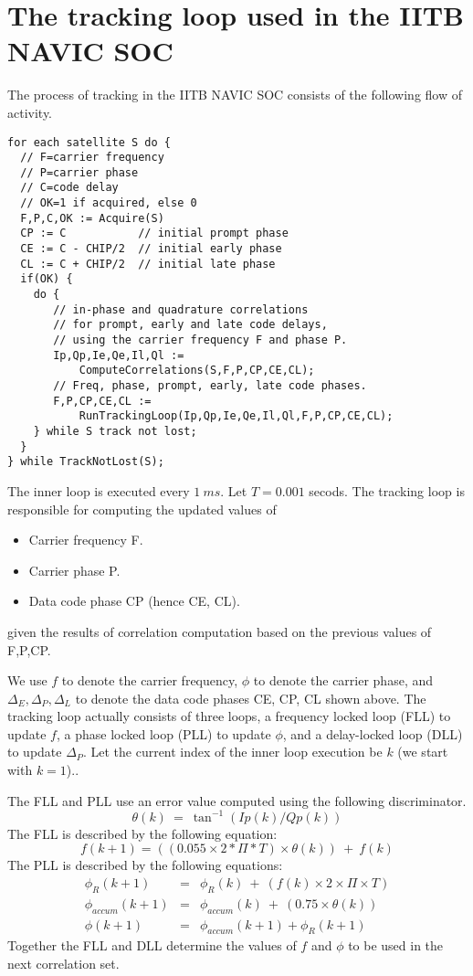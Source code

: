 \section{The tracking loop used in the IITB NAVIC SOC}

The process of tracking in the IITB NAVIC SOC consists of
the following flow of activity.

\begin{verbatim}
for each satellite S do {
  // F=carrier frequency
  // P=carrier phase
  // C=code delay
  // OK=1 if acquired, else 0
  F,P,C,OK := Acquire(S)
  CP := C           // initial prompt phase
  CE := C - CHIP/2  // initial early phase
  CL := C + CHIP/2  // initial late phase
  if(OK) {
    do {
       // in-phase and quadrature correlations
       // for prompt, early and late code delays,
       // using the carrier frequency F and phase P.
       Ip,Qp,Ie,Qe,Il,Ql := 
           ComputeCorrelations(S,F,P,CP,CE,CL);
       // Freq, phase, prompt, early, late code phases.
       F,P,CP,CE,CL :=
           RunTrackingLoop(Ip,Qp,Ie,Qe,Il,Ql,F,P,CP,CE,CL);
    } while S track not lost;
  }
} while TrackNotLost(S);
\end{verbatim}

The inner loop is executed every $1\ ms$. Let $T=0.001$ secods.
The tracking loop is responsible for computing
the updated values of 
\begin{itemize}
\item Carrier frequency F.
\item Carrier phase P.
\item Data code phase CP (hence CE, CL).
\end{itemize}
given the results of correlation computation based
on the previous values of F,P,CP.

We use $f$ to denote the carrier frequency,
$\phi$ to denote the carrier phase, and $\Delta_E, \Delta_P, \Delta_L$
to denote the data code phases CE, CP, CL shown above.  The tracking
loop actually consists of three loops, a frequency locked loop (FLL) to
update $f$, a phase locked loop (PLL) to update $\phi$, and a delay-locked
loop (DLL) to update $\Delta_P$.  Let the current index of the inner
loop execution be $k$ (we start with $k=1$)..

The FLL and PLL use an error value computed using the following
discriminator.
\begin{equation}
\theta(k) \ = \ \tan^{-1}(Ip(k)/Qp(k))
\end{equation}
The FLL is described by the following equation:
\begin{equation}
f(k+1)  =  ((0.055 \times 2 * \Pi * T) \times \theta(k))\ + \ f(k)
\end{equation}
The PLL is described by the following equations:
\begin{eqnarray*}
\phi_{R}(k+1) & = & \phi_R(k) \ + \ (f(k) \times 2 \times \Pi \times T) \\
\phi_{accum}(k+1)  & = & \phi_{accum}(k) \ + \ (0.75 \times \theta(k)) \\
\phi(k+1) & = & \phi_{accum}(k+1) + \phi_R(k+1)
\end{eqnarray*}
Together the FLL and DLL determine the values of $f$ and $\phi$ to
be used in the next correlation set.

